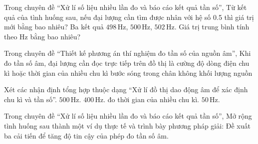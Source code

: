 \begin{ex}
Trong chuyên đề “Xử lí số liệu nhiều lần đo và báo cáo kết quả tần số”, Từ kết quả của tình huống sau, nếu đại lượng cần tìm được nhân với hệ số 0.5 thì giá trị mới bằng bao nhiêu? Ba kết quả $498\,\text{Hz}$, $500\,\text{Hz}$, $502\,\text{Hz}$. Giá trị trung bình tính theo Hz bằng bao nhiêu?
\end{ex}

\begin{ex}
Trong chuyên đề “Thiết kế phương án thí nghiệm đo tần số của nguồn âm”, Khi đo tần số âm, đại lượng cần đọc trực tiếp trên đồ thị là
\choice
{cường độ dòng điện}
{\True chu kì hoặc thời gian của nhiều chu kì}
{bước sóng trong chân không}
{khối lượng nguồn}
\end{ex}

\begin{ex}
Xét các nhận định tổng hợp thuộc dạng “Xử lí đồ thị dao động âm để xác định chu kì và tần số”.
\choiceTF
{\True $500\,\text{Hz}$.}
{\True $400\,\text{Hz}$.}
{\True đo thời gian của nhiều chu kì.}
{$50\,\text{Hz}$.}
\end{ex}

\begin{ex}
Trong chuyên đề “Xử lí số liệu nhiều lần đo và báo cáo kết quả tần số”, Mở rộng tình huống sau thành một ví dụ thực tế và trình bày phương pháp giải: Đề xuất ba cải tiến để tăng độ tin cậy của phép đo tần số âm.
\choiceTF

\end{ex}

